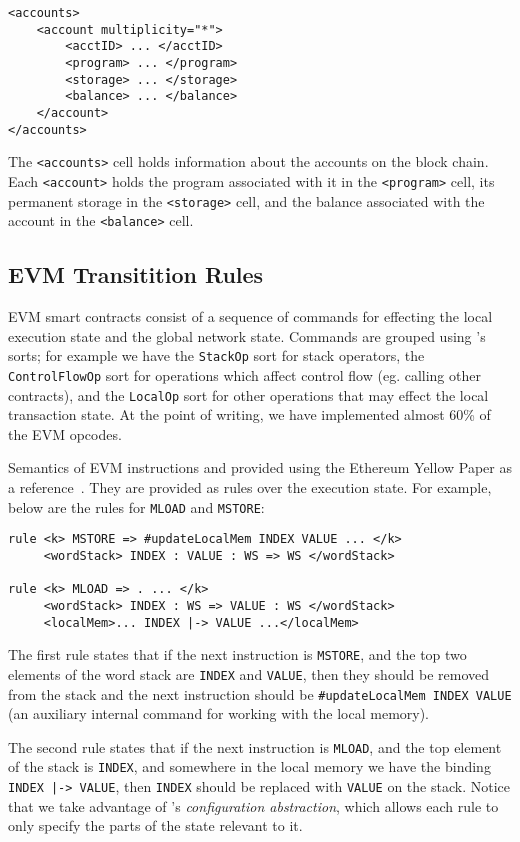 \begin{verbatim}
<accounts>
    <account multiplicity="*">
        <acctID> ... </acctID>
        <program> ... </program>
        <storage> ... </storage>
        <balance> ... </balance>
    </account>
</accounts>
\end{verbatim}

The \texttt{<accounts>} cell holds information about the accounts on the block
chain. Each \texttt{<account>} holds the program associated with it in the
\texttt{<program>} cell, its permanent storage in the \texttt{<storage>} cell,
and the balance associated with the account in the \texttt{<balance>} cell.

\subsection{EVM Transitition Rules}

EVM smart contracts consist of a sequence of commands for effecting the local
execution state and the global network state. Commands are grouped using \K{}'s
sorts; for example we have the \texttt{StackOp} sort for stack operators, the
\texttt{ControlFlowOp} sort for operations which affect control flow (eg.
calling other contracts), and the \texttt{LocalOp} sort for other operations
that may effect the local transaction state. At the point of writing, we have
implemented almost 60\% of the EVM opcodes.

Semantics of EVM instructions and provided using the Ethereum Yellow Paper as a
reference~\cite{wood2014ethereum}. They are provided as \K{} rules over the
execution state. For example, below are the rules for \texttt{MLOAD} and
\texttt{MSTORE}:

\begin{verbatim}
rule <k> MSTORE => #updateLocalMem INDEX VALUE ... </k>
     <wordStack> INDEX : VALUE : WS => WS </wordStack>

rule <k> MLOAD => . ... </k>
     <wordStack> INDEX : WS => VALUE : WS </wordStack>
     <localMem>... INDEX |-> VALUE ...</localMem>
\end{verbatim}

The first rule states that if the next instruction is \texttt{MSTORE}, and the
top two elements of the word stack are \texttt{INDEX} and \texttt{VALUE}, then
they should be removed from the stack and the next instruction should be
\texttt{\#updateLocalMem INDEX VALUE} (an auxiliary internal command for working
with the local memory).

The second rule states that if the next instruction is \texttt{MLOAD}, and the
top element of the stack is \texttt{INDEX}, and somewhere in the local memory we
have the binding \texttt{INDEX |-> VALUE}, then \texttt{INDEX} should be
replaced with \texttt{VALUE} on the stack. Notice that we take advantage of \K{}'s
\textit{configuration abstraction}, which allows each rule to only specify the
parts of the state relevant to it.

